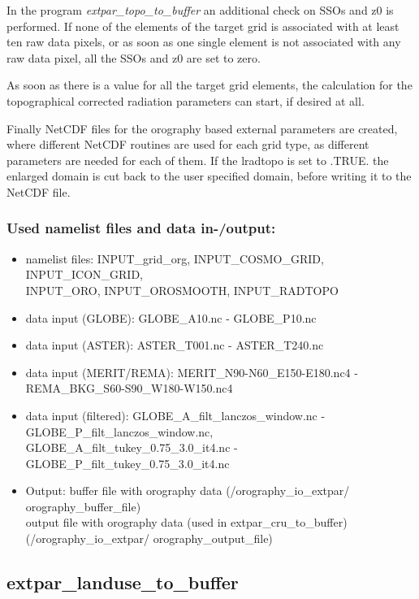 \documentclass[a4paper,10pt,DIV14,BCOR1cm,titlepage,twoside]{scrartcl}
\begin{document}
In the program \textit{extpar\_topo\_to\_buffer} an additional check on SSOs and z0 is performed. If none of the elements of the target grid is associated with at least ten raw data pixels, or as soon as one single element is not associated with any raw data pixel, all the SSOs and z0 are set to zero.\par\medskip\noindent
As soon as there is a value for all the target grid elements, the calculation for the topographical corrected radiation parameters can start, if desired at all.\par\medskip\noindent
Finally NetCDF files for the orography based external parameters are created, where different NetCDF routines are used for each grid type, as different parameters are needed for each of them. If the lradtopo is set to .TRUE. the enlarged domain is cut back to the user specified domain, before writing it to the NetCDF file.\par\medskip\noindent
\subsubsection{Used namelist files and data in-/output:}
\begin{itemize}
 \item namelist files: INPUT\_grid\_org, INPUT\_COSMO\_GRID, INPUT\_ICON\_GRID, \\
     INPUT\_ORO, INPUT\_OROSMOOTH, INPUT\_RADTOPO
\item data input (GLOBE): GLOBE\_A10.nc - GLOBE\_P10.nc 
\item data input (ASTER): ASTER\_T001.nc - ASTER\_T240.nc 
\item data input (MERIT/REMA): MERIT\_N90-N60\_E150-E180.nc4 - REMA\_BKG\_S60-S90\_W180-W150.nc4 
\item data input (filtered): GLOBE\_A\_filt\_lanczos\_window.nc - GLOBE\_P\_filt\_lanczos\_window.nc, \\
    GLOBE\_A\_filt\_tukey\_0.75\_3.0\_it4.nc - GLOBE\_P\_filt\_tukey\_0.75\_3.0\_it4.nc
\item Output: buffer file with orography data (/orography\_io\_extpar/ orography\_buffer\_file) \\
              output file with orography data (used in extpar\_cru\_to\_buffer)\\
              (/orography\_io\_extpar/ orography\_output\_file)
\end{itemize}

\subsection{extpar\_landuse\_to\_buffer}\label{extpar_landuse_to_buffer}
\end{document}
